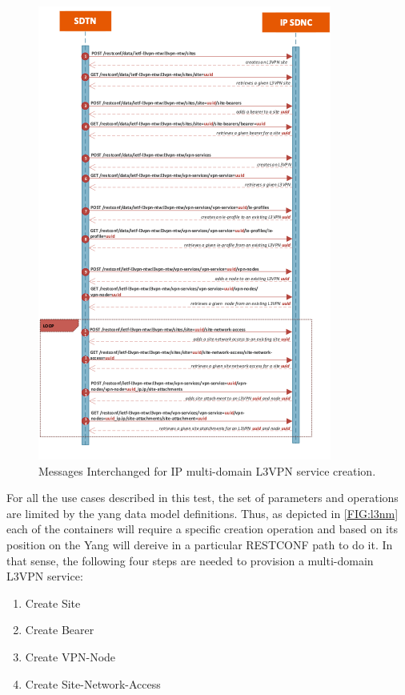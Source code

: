 \documentclass[a4paper,fleqn]{cas-dc}
\begin{document}
\begin{figure}
	\centering
		\includegraphics[width=\linewidth]{figs/l3vpn_workflow.png}
	\caption{Messages Interchanged for IP multi-domain L3VPN service creation.}
	\label{FIG:l3vpn_workflow}
\end{figure}

For all the use cases described in this test, the set of parameters and operations are limited by the yang data model definitions. Thus, as depicted in \cref{FIG:l3nm} each of the containers will require a specific creation operation and based on its position on the Yang will dereive in a particular RESTCONF path to do it. In that sense, the following four steps are needed to provision a multi-domain L3VPN service:
\begin{enumerate}
    \item Create Site
    \item Create Bearer
    \item Create VPN-Node
    \item Create Site-Network-Access
\end{enumerate}
\end{document}
